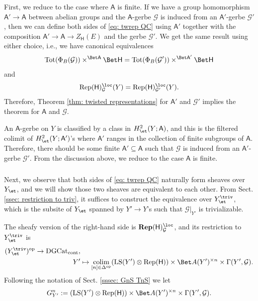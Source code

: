\documentclass[10pt]{amsart}
\newcommand{\sssec}{\subsubsection}
\theoremstyle{remark}
\newcommand{\on}{\operatorname}
\newcommand{\cG}{\mathcal{G}}
\newcommand{\DGcat}{\on{DGCat}_{\on{cont}}}
\newcommand{\Rep}{\on{Rep}}
\newcommand{\LS}{\on{LS}}
\DeclareMathOperator{\op}{op}
\DeclareMathOperator{\colim}{colim}
\newcommand{\sfA}{\mathsf{A}}
\begin{document}
\sssec{}
First, we reduce to the case where $\sfA$ is finite. If we have a group homomorphism $\sfA'\rightarrow\sfA$ between abelian groups and the $\sfA$-gerbe $\cG$ is induced from an $\sfA'$-gerbe $\cG'$, then we can define both sides of \eqref{eq: twrep QC} using $\sfA'$ together with the composition $\sfA'\rightarrow \sfA\rightarrow Z_{\mathsf{H}}(E)$ and the gerbe $\cG'$. We get the same result using either choice, i.e., we have canonical equivalences
\[\on{Tot}(\Phi_B(\cG))\times^{\Bet \sfA}\Bet \mathsf{H}= \on{Tot}(\Phi_B(\cG'))\times^{\Bet \sfA'}\Bet \mathsf{H}\]
and
\[\Rep(\mathsf{H})^{\loc}_{\cG}(Y)=\Rep(\mathsf{H})^{\loc}_{\cG'}(Y).\]
Therefore, Theorem \ref{thm: twisted representations} for $\sfA'$ and $\cG'$ implies the theorem for $\sfA$ and $\cG$.
\medskip

An $\sfA$-gerbe on $Y$ is classified by a class in $H^2_{\et}(Y; \sfA)$, and this is the filtered colimit of $H^2_{\et}(Y;\sfA')$'s where $\sfA'$ ranges in the collection of finite subgroups of $\sfA$. Therefore, there should be some finite $\sfA'\subseteq \sfA$ such that $\cG$ is induced from an $\sfA'$-gerbe $\cG'$. From the discussion above, we reduce to the case $\sfA$ is finite.

\sssec{}
Next, we observe that both sides of \eqref{eq: twrep QC} naturally form sheaves over $Y_{\et}$, and we will show those two sheaves are equivalent to each other. From Sect. \ref{ssec: restriction to triv}, it suffices to construct the equivalence over $Y^{\triv}_{\et}$, which is the subsite of $Y_{\et}$ spanned by $Y'\rightarrow Y$'s such that $\cG|_{Y'}$ is trivializable.
\medskip

The sheafy version of the right-hand side is $\mathbf{Rep}(\mathsf{H})^{\loc}_{\cG}$, and its restriction to $Y^{\triv}_{\et}$ is
\begin{align}\label{eq: twRep sheaf on triv}
    (Y^{\triv}_{\et})^{\op}\rightarrow\DGcat,& \\
    Y'&\mapsto \colim_{[n]\in\Delta^{\op}}(\LS(Y')\otimes\Rep(\mathsf{H}))\times \Bet A(Y')^{\times n}\times \Gamma(Y',\cG). \nonumber
\end{align}
Following the notation of Sect. \ref{sssec: GnS TnS} we let
\[G^n_{Y'}:= (\LS(Y')\otimes\Rep(\mathsf{H}))\times \Bet A(Y')^{\times n}\times \Gamma(Y',\cG).\]
\end{document}
